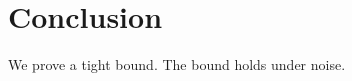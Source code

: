 \documentclass{article}
\begin{document}
\begin{abstract}
We prove a tight bound. The bound holds under noise. It matters for deployment today.
\end{abstract}
\section{Conclusion}
We prove a tight bound. The bound holds under noise.
\end{document}
